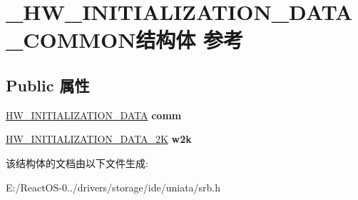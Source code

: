\hypertarget{struct___h_w___i_n_i_t_i_a_l_i_z_a_t_i_o_n___d_a_t_a___c_o_m_m_o_n}{}\section{\+\_\+\+H\+W\+\_\+\+I\+N\+I\+T\+I\+A\+L\+I\+Z\+A\+T\+I\+O\+N\+\_\+\+D\+A\+T\+A\+\_\+\+C\+O\+M\+M\+O\+N结构体 参考}
\label{struct___h_w___i_n_i_t_i_a_l_i_z_a_t_i_o_n___d_a_t_a___c_o_m_m_o_n}
\subsection*{Public 属性}
\begin{DoxyCompactItemize}
\item 
\mbox{\label{struct___h_w___i_n_i_t_i_a_l_i_z_a_t_i_o_n___d_a_t_a___c_o_m_m_o_n_a840e0037b63befb060f6aaa3ab24e030}} 
\hyperlink{struct___h_w___i_n_i_t_i_a_l_i_z_a_t_i_o_n___d_a_t_a}{H\+W\+\_\+\+I\+N\+I\+T\+I\+A\+L\+I\+Z\+A\+T\+I\+O\+N\+\_\+\+D\+A\+TA} {\bfseries comm}
\item 
\mbox{\label{struct___h_w___i_n_i_t_i_a_l_i_z_a_t_i_o_n___d_a_t_a___c_o_m_m_o_n_a4fd2f5a9247223961c9852fdd6c30d62}} 
\hyperlink{struct___h_w___i_n_i_t_i_a_l_i_z_a_t_i_o_n___d_a_t_a__2_k}{H\+W\+\_\+\+I\+N\+I\+T\+I\+A\+L\+I\+Z\+A\+T\+I\+O\+N\+\_\+\+D\+A\+T\+A\+\_\+2K} {\bfseries w2k}
\end{DoxyCompactItemize}


该结构体的文档由以下文件生成\+:\begin{DoxyCompactItemize}
\item 
E\+:/\+React\+O\+S-\/0../drivers/storage/ide/uniata/srb.\+h\end{DoxyCompactItemize}
